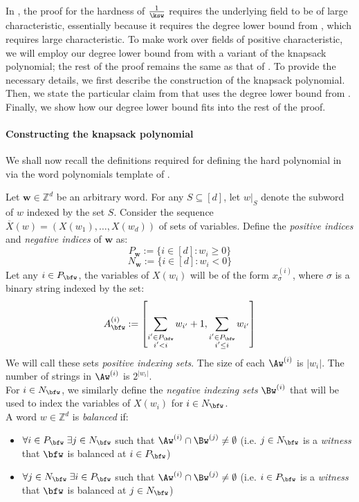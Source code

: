 \documentclass[11pt]{article}
\begin{document}
In \cite{GHT}, the proof for the hardness of $\frac{1}{\ksw}$ requires the underlying field to be of large characteristic, essentially because it requires the degree lower bound from \cite{FSTW21}, which requires large characteristic. To make  work over fields of positive characteristic, we will employ our degree lower bound from  with a variant of the knapsack polynomial; the rest of the proof remains the same as that of . To provide the necessary details, we first describe the construction of the knapsack polynomial. Then, we state the particular claim from \cite{GHT} that uses the degree lower bound from \cite{FSTW21}. Finally, we show how our degree lower bound  fits into the rest of the proof. 

\paragraph{Constructing the knapsack polynomial}
We shall now recall the definitions required for defining the hard polynomial in \cite{GHT} via the word polynomials template of \cite{LST}. 

Let $\mathbf{w} \in \mathbb{Z}^d$ be an arbitrary word. For any $S\subseteq [d]$, let $w|_{S}$ denote the subword of $w$ indexed by the set $S$. Consider the sequence $\overline{X}(w) = (X(w_1),\dots, X(w_d))$ of sets of variables. Define the \emph{positive indices} and \emph{negative indices} of $\mathbf{w}$ as:
$$P_{\mathbf{w}} := \{i\in [d]: w_i \geq 0\}$$
$$N_{\mathbf{w}} := \{i\in [d]: w_i < 0\}$$
Let any $i\in P_\bfw$, the variables of $X(w_i)$ will be of the form $x_{\sigma}^{(i)}$, where $\sigma$ is a binary string indexed by the set:
$$A_\bfw^{(i)} := \left[ \sum_{\substack{i' \in P_\bfw\\ i'<i}} w_{i'} + 1,\sum_{\substack{i' \in P_\bfw\\ i'\leq i}}w_{i'}\right ]$$
We will call these sets \emph{positive indexing sets}. The size of each $\Aw^{(i)}$ is $|w_i|$. The number of strings in $\Aw^{(i)}$ is $2^{|w_i|}$. \\
For $i\in N_\bfw$, we similarly define the \emph{negative indexing sets} $\Bw^{(i)}$ that will be used to index the variables of $X(w_i)$ for $i\in N_\bfw$. \\
A word $w\in \mathbb{Z}^d$ is \emph{balanced} if:
\begin{itemize}
    \item $\forall i\in P_\bfw \; \exists j \in N_\bfw$ such that $\Aw^{(i)} \cap \Bw^{(j)} \neq \emptyset$ (i.e. $j\in N_\bfw$ is a \emph{witness} that $\bfw$ is balanced at $i\in P_\bfw$)
    \item $\forall j\in N_\bfw \; \exists i \in P_\bfw$ such that $\Aw^{(i)} \cap \Bw^{(j)} \neq \emptyset$ (i.e. $i\in P_\bfw$ is a \emph{witness} that $\bfw$ is balanced at $j\in N_\bfw$)
\end{itemize}
\end{document}
